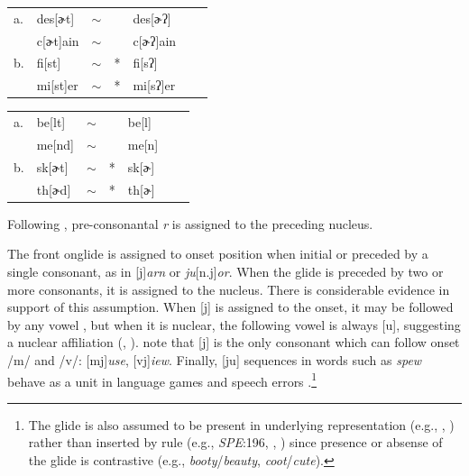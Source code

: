 \documentclass[12pt]{article}
\newcommand{\alt}{\ensuremath{\sim}}
\begin{document}
\begin{example}
\label{tglottalization}
\begin{tabular}{l l l l@{} l l l}
a. & {des}[ɚt]    & \alt{} &   & {des}[ɚʔ]    \\
   & {c}[ɚt]{ain} & \alt{} &   & {c}[ɚʔ]{ain} \\
b. & {fi}[st]     & \alt{} & * & {fi}[sʔ]     \\
   & {mi}[st]{er} & \alt{} & * & {mi}[sʔ]{er} \\
\end{tabular}
\end{example}

\begin{example}
\label{tddeletion}
\begin{tabular}{l l l l@{} l l l}
a. & {be}[lt] & \alt{} &   & {be}[l] \\
   & {me}[nd] & \alt{} &   & {me}[n] \\
b. & {sk}[ɚt] & \alt{} & * & {sk}[ɚ] \\
   & {th}[ɚd] & \alt{} & * & {th}[ɚ] \\
\end{tabular}
\end{example}

\noindent
Following \citet{Pierrehumbert1994}, pre-consonantal \emph{r} is assigned to the preceding nucleus.

The front onglide is assigned to onset position when initial or preceded by a single consonant, as in [j]\emph{arn} or \emph{ju}[n.j]\emph{or}. When the glide is preceded by two or more consonants, it is assigned to the nucleus. There is considerable evidence in support of this assumption. When [j] is assigned to the onset, it may be followed by any vowel \citep[276]{Borowsky1986}, but when it is nuclear, the following vowel is always [u], suggesting a nuclear affiliation (\citealp[61f.]{Harris1994}, \citealp[232]{Hayes1980}). \citet[42]{Clements1983} note that [j] is the only consonant which can follow onset /m/ and /v/: [mj]\emph{use}, [vj]\emph{iew}. Finally, [ju] sequences in words such as \emph{spew} behave as a unit in language games \citep{Davis1995,Nevins2003} and speech errors \citep[130]{Shattuck-Hufnagel1986}.\footnote{The glide is also assumed to be present in underlying representation (e.g., \citealp{Anderson1988b}, \citealp[278]{Borowsky1986}) rather than inserted by rule (e.g., \emph{SPE}:196, \citealp[][89]{Halle1985a}, \citealp[][217]{McMahon1990}) since presence or absense of the glide is contrastive (e.g., \emph{booty}/\emph{beauty}, \emph{coot}/\emph{cute}).}
\end{document}
